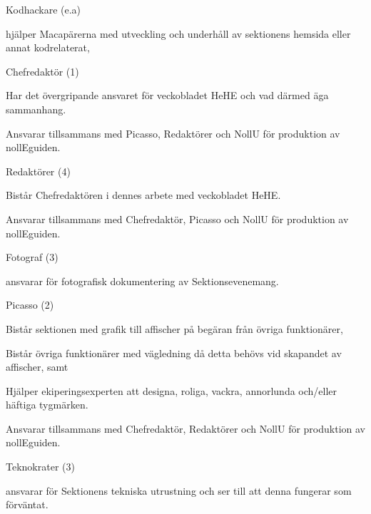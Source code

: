 \documentclass[10pt]{article}
\begin{document}
\begin{emptylist}
\begin{dashlist}
        \end{dashlist}
	\item Kodhackare (e.a)
        \begin{dashlist}
            \item hjälper Macapärerna med utveckling och underhåll av
                sektionens hemsida eller annat kodrelaterat,
        \end{dashlist}
    \item Chefredaktör (1)
    		\begin{dashlist}
    			\item Har det övergripande ansvaret för veckobladet HeHE och vad därmed äga sammanhang.
          \item Ansvarar tillsammans med Picasso, Redaktörer och NollU för produktion av nollEguiden.
    		\end{dashlist}
    	\item Redaktörer (4)
    		\begin{dashlist}
    			\item Bistår Chefredaktören i dennes arbete med veckobladet HeHE.
          \item Ansvarar tillsammans med Chefredaktör, Picasso och NollU för produktion av nollEguiden.
    		\end{dashlist}
    \item Fotograf (3)
        \begin{dashlist}
            \item ansvarar för fotografisk dokumentering av Sektionsevenemang.
        \end{dashlist}
    \item Picasso (2)
		\begin{dashlist}
            \item Bistår sektionen med grafik till affischer på begäran från övriga funktionärer,
            \item Bistår övriga funktionärer med vägledning då detta behövs vid skapandet av affischer, samt
            \item Hjälper ekiperingsexperten att designa, roliga, vackra, annorlunda och/eller häftiga tygmärken.
            \item Ansvarar tillsammans med Chefredaktör, Redaktörer och NollU för produktion av nollEguiden.
        \end{dashlist}
    \item Teknokrater (3)
        \begin{dashlist}
            \item ansvarar för Sektionens tekniska utrustning och ser till att denna fungerar som förväntat.
        \end{dashlist}
\end{emptylist}
\end{document}
